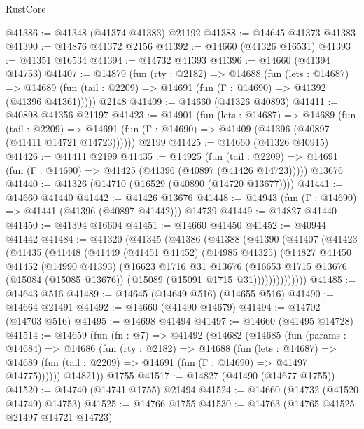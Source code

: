 \begin{lexlean}{RustCore}
\begin{coremodule}
@41386 := @41348 (@41374 @41383) @21192
@41388 := @14645 @41373 @41383
@41390 := @14876 @41372 @2156
@41392 := @14660 (@41326 @16531)
@41393 := @41351 @16534
@41394 := @14732 @41393
@41396 := @14660 (@41394 @14753)
@41407 := @14879
    (fun (rty : @2182) =>
    @14688
      (fun (lets : @14687) =>
      @14689 (fun (tail : @2209) => @14691 (fun (Γ : @14690) => @41392 (@41396 @41361)))))
    @2148
@41409 := @14660 (@41326 @40893)
@41411 := @40898 @41356 @21197
@41423 := @14901
    (fun (lets : @14687) =>
    @14689
      (fun (tail : @2209) =>
      @14691 (fun (Γ : @14690) => @41409 (@41396 (@40897 (@41411 @14721 @14723))))))
    @2199
@41425 := @14660 (@41326 @40915)
@41426 := @41411 @2199
@41435 := @14925
    (fun (tail : @2209) => @14691 (fun (Γ : @14690) => @41425 (@41396 (@40897 (@41426 @14723)))))
    @13676
@41440 := @41326 (@14710 (@16529 (@40890 (@14720 @13677))))
@41441 := @14660 @41440
@41442 := @41426 @13676
@41448 := @14943 (fun (Γ : @14690) => @41441 (@41396 (@40897 @41442))) @14739
@41449 := @14827 @41440
@41450 := @41394 @16604
@41451 := @14660 @41450
@41452 := @40944 @41442
@41484 := @41320
    (@41345
      (@41386
        (@41388
          (@41390
            (@41407
              (@41423
                (@41435
                  (@41448
                    (@41449
                      (@41451 @41452)
                      (@14985 @41325)
                      (@14827
                        @41450
                        @41452
                        (@14990 @41393)
                        (@16623
                          @1716
                          @31
                          @13676
                          (@16653
                            @1715
                            @13676
                            (@15084 (@15085 @13676))
                            (@15089 (@15091 @1715 @31))))))))))))))
@41485 := @14643 @516
@41489 := @14645 (@14649 @516) (@14655 @516)
@41490 := @14664 @21491
@41492 := @14660 (@41490 @14679)
@41494 := @14702 (@14703 @516)
@41495 := @14698 @41494
@41497 := @14660 (@41495 @14728)
@41514 := @14659
    (fun (fn : @7) =>
    @41492
      (@14682
        (@14685
          (fun (params : @14684) =>
          @14686
            (fun (rty : @2182) =>
            @14688
              (fun (lets : @14687) =>
              @14689 (fun (tail : @2209) => @14691 (fun (Γ : @14690) => @41497 @14775))))))
        @14821))
    @1755
@41517 := @14827 (@41490 (@14677 @1755))
@41520 := @14740 (@14741 @1755) @21494
@41524 := @14660 (@14732 (@41520 @14749) @14753)
@41525 := @14766 @1755
@41530 := @14763 (@14765 @41525 @21497 @14721 @14723)

\end{coremodule}
\end{lexlean}
